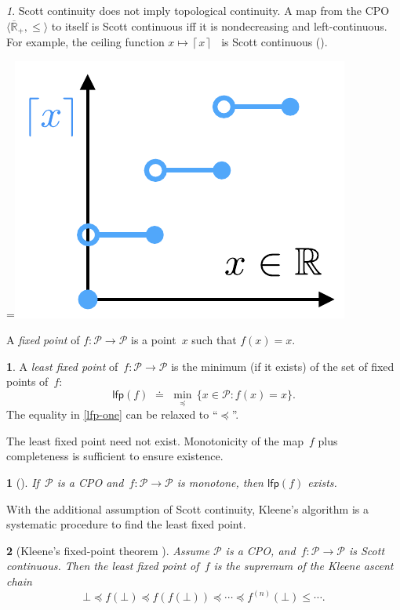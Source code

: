 \documentclass[twocolumn,english]{IEEEtran}
\theoremstyle{definition}
\newtheorem{defn}{\protect\definitionname}
\theoremstyle{plain}
\newtheorem{lem}{\protect\lemmaname}
\theoremstyle{definition}
\theoremstyle{remark}
\newtheorem{rem}{\protect\remarkname}
\theoremstyle{definition}
\theoremstyle{plain}
\theoremstyle{plain}
\newcommand{\aword}[1]{\mathsf{#1}}
\newcommand{\vmath}[1]{\aword{#1}}
\newcommand{\posleq}{\preceq}
\newcommand{\posA}{\mathcal{P}}
\newcommand{\lfp}{\vmath{lfp}}
\newcommand{\CPO}{\textsc{CPO}\xspace}
\newcommand{\Rcomp}{\overline{\mathbb{R}}_+}
\newcommand*{\vcenteredhbox}[1]{\begingroup
\setbox0=\hbox{#1}\parbox{\wd0}{\box0}\endgroup}
\newcommand{\captionsideleft}[2]{
    \medskip
    \begin{minipage}{1.8cm}{
        \hfill
        \protect\captionof{figure}{#1}}\end{minipage}
    \begin{minipage}{6.6cm}
    
    \vcenteredhbox{{#2}}
    \hfill
    \end{minipage}
    \medskip
}
\newcommand{\scottcontinuous}{Scott continuous\xspace}
\newcommand{\scottcontinuity}{Scott continuity\xspace}
\providecommand{\definitionname}{Definition}
\providecommand{\lemmaname}{Lemma}
\providecommand{\remarkname}{Remark}
\begin{document}
\begin{rem}
\scottcontinuity does not imply topological continuity. A map from
the CPO $\langle\Rcomp,\leq\rangle$ to itself is \scottcontinuous
iff it is nondecreasing and left-continuous. For example, the ceiling
function $x\mapsto\left\lceil x\right\rceil $~ is \scottcontinuous
().
\end{rem}
\captionsideleft{\label{fig:ceil}}{\includegraphics[scale=0.33]{gmcdptro_ceil}}

\emph{}

A \emph{fixed} \emph{point} of $f:\posA\rightarrow\posA$ is a point~$x$
such that $f(x)=x$. 
\begin{defn}
A \emph{least fixed point} of~$f:\posA\rightarrow\posA$ is the minimum
(if it exists) of the set of fixed points of~$f$:
\begin{equation}
\lfp(f)\,\,\doteq\,\,\min_{\posleq}\,\{x\in\posA\colon f(x)=x\}.\label{eq:lfp-one}
\end{equation}
The equality in \eqref{lfp-one} can be relaxed to ``$\posleq$''.
\end{defn}
The least fixed point need not exist. Monotonicity of the map~$f$
plus completeness is sufficient to ensure existence.
\begin{lem}[{\cite[CPO Fixpoint Theorem II, 8.22]{davey02}}]
\label{lem:CPO-fix-point-2}If~$\posA$ is a \CPO and~$f:\posA\rightarrow\posA$
is monotone, then $\lfp(f)$ exists.
\end{lem}


With the additional assumption of \scottcontinuity, Kleene's algorithm
is a systematic procedure to find the least fixed point.
\begin{lem}[{Kleene's fixed-point theorem \cite[CPO fixpoint theorem I, 8.15]{davey02}}]
\label{lem:kleene-1}Assume $\posA$ is a \CPO, and~$f:\posA\rightarrow\posA$
is \scottcontinuous. Then the least fixed point of~$f$ is the supremum
of the Kleene ascent chain 
\[
\bot\posleq f(\bot)\posleq f(f(\bot))\posleq\cdots\posleq f^{(n)}(\bot)\leq\cdots.
\]
\end{lem}
\end{document}
